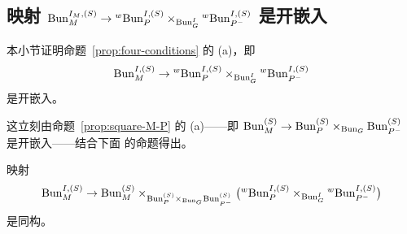 
\subsection{\texorpdfstring{映射 $\mathrm{Bun}^{I_M,(S)}_M\to {}^{w}\mathrm{Bun}^{I,(S)}_P\times_{\mathrm{Bun}^I_G}{}^{w}\mathrm{Bun}^{I,(S)}_{P^-}$ 是开嵌入}{映射 IM,(S)M wI,(S)PIGwI,(S)P- 是开嵌入}}
\label{sec:four-a}

本小节证明命题~\ref{prop:four-conditions} 的 (a)，即
\[
\mathrm{Bun}^{I,(S)}_M\to
{}^{w}\mathrm{Bun}^{I,(S)}_P\times_{\mathrm{Bun}^I_G}{}^{w}\mathrm{Bun}^{I,(S)}_{P^-}
\]
是开嵌入。

这立刻由命题~\ref{prop:square-M-P} 的 (a)——即
$\mathrm{Bun}^{(S)}_M\to \mathrm{Bun}^{(S)}_P\times_{\mathrm{Bun}_G}\mathrm{Bun}^{(S)}_{P^-}$ 是开嵌入——结合下面
的命题得出。

\begin{proposition}
\label{prop:open-embedding-iso}
映射
\[
\mathrm{Bun}^{I,(S)}_M\to
\mathrm{Bun}^{(S)}_M\times_{\mathrm{Bun}^{(S)}_P\times_{\mathrm{Bun}_G}\mathrm{Bun}^{(S)}_{P^-}}
\bigl({}^{w}\mathrm{Bun}^{I,(S)}_P\times_{\mathrm{Bun}^I_G}{}^{w}\mathrm{Bun}^{I,(S)}_{P^-}\bigr)
\]
是同构。
\end{proposition}

